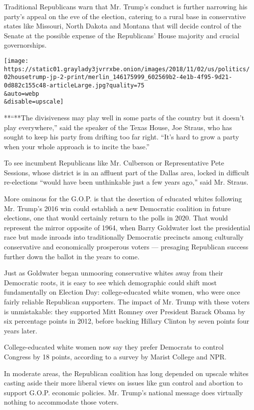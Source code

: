 Traditional Republicans warn that Mr. Trump's conduct is further
narrowing his party's appeal on the eve of the election, catering to a
rural base in conservative states like Missouri, North Dakota and
Montana that will decide control of the Senate at the possible expense
of the Republicans' House majority and crucial governorships.

\texttt{[image: https://static01.graylady3jvrrxbe.onion/images/2018/11/02/us/politics/02housetrump-jp-2-print/merlin\_146175999\_602569b2-4e1b-4f95-9d21-0d882c155c48-articleLarge.jpg?quality=75\\\&auto=webp\\\&disable=upscale]}

**``**The divisiveness may play well in some parts of the country but it
doesn't play everywhere,'' said the speaker of the Texas House, Joe
Straus, who has sought to keep his party from drifting too far right.
``It's hard to grow a party when your whole approach is to incite the
base.''

To see incumbent Republicans like Mr. Culberson or Representative Pete
Sessions, whose district is in an affluent part of the Dallas area,
locked in difficult re-elections ``would have been unthinkable just a
few years ago,'' said Mr. Straus.

More ominous for the G.O.P. is that the desertion of educated whites
following Mr. Trump's 2016 win could establish a new Democratic
coalition in future elections, one that would certainly return to the
polls in 2020. That would represent the mirror opposite of 1964, when
Barry Goldwater lost the presidential race but made inroads into
traditionally Democratic precincts among culturally conservative and
economically prosperous voters --- presaging Republican success further
down the ballot in the years to come.

Just as Goldwater began unmooring conservative whites away from their
Democratic roots, it is easy to see which demographic could shift most
fundamentally on Election Day: college-educated white women, who were
once fairly reliable Republican supporters. The impact of Mr. Trump with
these voters is unmistakable: they supported Mitt Romney over President
Barack Obama by six percentage points in 2012, before backing Hillary
Clinton by seven points four years later.

College-educated white women now say they prefer Democrats to control
Congress by 18 points, according to a survey by Marist College and NPR.

In moderate areas, the Republican coalition has long depended on upscale
whites casting aside their more liberal views on issues like gun control
and abortion to support G.O.P. economic policies. Mr. Trump's national
message does virtually nothing to accommodate those voters.

